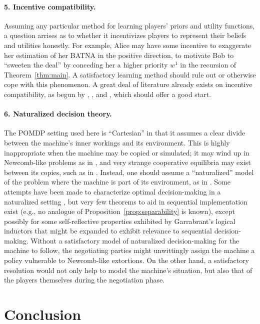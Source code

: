 \documentclass{article}  %
\newcommand{\thm}[1]{Theorem~\ref{thm:#1}}
\newcommand{\prop}[1]{Proposition~\ref{prop:#1}}
\begin{document}
\paragraph{5. Incentive compatibility.}  Assuming any particular method for learning players' priors and utility functions, a question arrises as to whether it incentivizes players to represent their beliefs and utilities honestly.  For example, Alice  may have some incentive to exaggerate her estimation of her BATNA in the positive direction, to motivate Bob to ``sweeten the deal'' by conceding her a higher priority $w^1$ in the recursion of \thm{main}.  A satisfactory learning method should rule out or otherwise cope with this phenomenon.  A great deal of literature already exists on incentive compatibility, as begun by \cite{My79}, \cite{Hu72}, and \cite{MS83}, which should offer a good start.


\paragraph{6. Naturalized decision theory.} The POMDP setting used here is ``Cartesian'' in that it assumes a clear divide between the machine's inner workings and its environment.  This is highly inappropriate when the machine may be copied or simulated; it may wind up in Newcomb-like problems as in \cite{SF15}, and very strange cooperative equilibria may exist between its copies, such as in \cite{Cri16}.  Instead, one should assume a ``naturalized'' model of the problem where the machine is part of its environment, as in \cite{FST15}.  Some attempts have been made to characterize optimal decision-making in a naturalized setting \cite{OR12}, but very few theorems to aid in sequential implementation exist (e.g., no analogue of \prop{separability} is known), except possibly for some self-reflective properties exhibited by Garrabrant's logical inductors \cite{GBCST16} that might be expanded to exhibit relevance to sequential decision-making.   Without a satisfactory model of naturalized decision-making for the machine to follow, the negotiating parties might unwittingly assign the machine a policy vulnerable to Newcomb-like extortions.  On the other hand, a satisfactory resolution would not only help to model the machine's situation, but also that of the players themselves during the negotiation phase.

\section{Conclusion}
\end{document}
